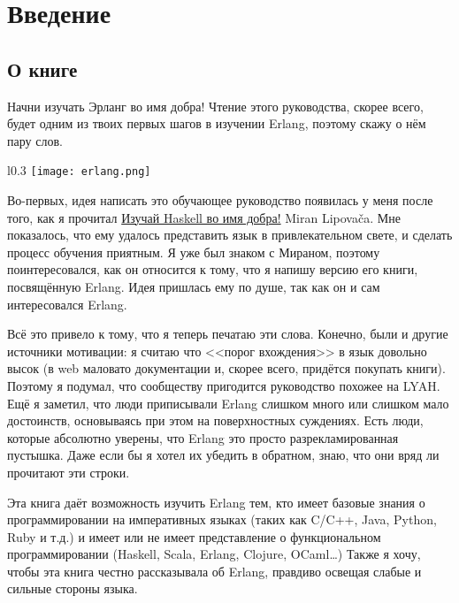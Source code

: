 \chapter{Введение}\label{introduction}

\section{О книге}

Начни изучать Эрланг во имя добра! Чтение этого руководства, скорее всего, будет одним из твоих первых шагов в изучении Erlang, поэтому скажу о нём пару слов.

\begin{wrapfigure}{l}{0.3\linewidth}
    \texttt{[image: erlang.png]}
\end{wrapfigure}

Во\--первых, идея написать это обучающее руководство появилась у меня после того, как я прочитал \href{http://learnyouahaskell.com}{Изучай Haskell во имя добра!} Miran Lipova\v{c}a. Мне показалось, что ему удалось представить язык в привлекательном свете, и сделать процесс обучения приятным. Я уже был знаком с Мираном, поэтому поинтересовался, как он относится к тому, что я напишу версию его книги, посвящённую Erlang. Идея пришлась ему по душе, так как он и сам интересовался Erlang.

Всё это привело к тому, что я теперь печатаю эти слова. Конечно, были и другие источники мотивации: я считаю что <<порог вхождения>> в язык довольно высок (в web маловато документации и, скорее всего, придётся покупать книги). Поэтому я подумал, что сообществу пригодится руководство похожее на LYAH. Ещё я заметил, что люди приписывали Erlang слишком много или слишком мало достоинств, основываясь при этом на поверхностных суждениях. Есть люди, которые абсолютно уверены, что Erlang это просто разрекламированная пустышка. Даже если бы я хотел их убедить в обратном, знаю, что они вряд ли прочитают эти строки.

Эта книга даёт возможность изучить Erlang тем, кто имеет базовые знания о программировании на императивных языках (таких как C/C++, Java, Python, Ruby и т.д.) и имеет или не имеет представление о функциональном программировании (Haskell, Scala, Erlang, Clojure, OCaml\ldots) Также я хочу, чтобы эта книга честно рассказывала об Erlang, правдиво освещая слабые и сильные стороны языка.

